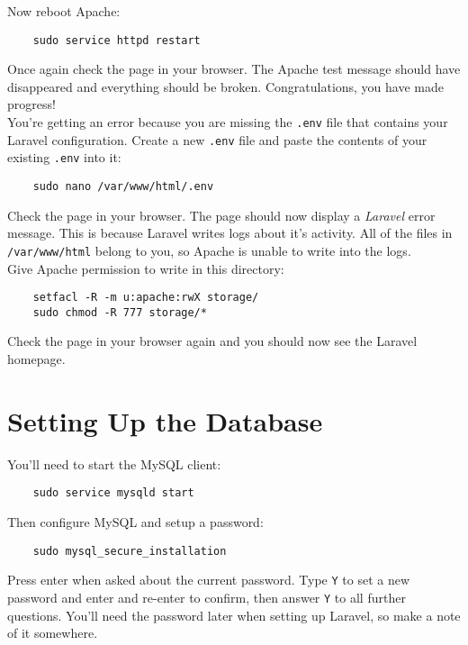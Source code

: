 Now reboot Apache:

\begin{verbatim}
    sudo service httpd restart
\end{verbatim}

Once again check the page in your browser. The Apache test message should have disappeared and everything should be broken. Congratulations, you have made progress!
\\

You're getting an error because you are missing the \texttt{.env} file that contains your Laravel configuration. Create a new \texttt{.env} file and paste the contents of your existing \texttt{.env} into it:

\begin{verbatim}
    sudo nano /var/www/html/.env
\end{verbatim}


Check the page in your browser. The page should now display a \textit{Laravel} error message. This is because Laravel writes logs about it's activity. All of the files in \texttt{/var/www/html} belong to you, so Apache is unable to write into the logs.
\\

Give Apache permission to write in this directory:

\begin{verbatim}
    setfacl -R -m u:apache:rwX storage/
    sudo chmod -R 777 storage/*
\end{verbatim}

Check the page in your browser again and you should now see the Laravel homepage.


\section{Setting Up the Database}

You'll need to start the MySQL client:

\begin{verbatim}
    sudo service mysqld start
\end{verbatim}

Then configure MySQL and setup a password:

\begin{verbatim}
    sudo mysql_secure_installation
\end{verbatim}

Press enter when asked about the current password. Type \texttt{Y} to set a new password and enter and re-enter to confirm, then answer \texttt{Y} to all further questions. You'll need the password later when setting up Laravel, so make a note of it somewhere.

